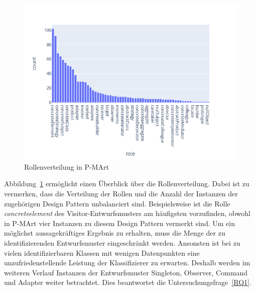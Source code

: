 \pagebreak

\begin{figure}[h]
    \centering
    \includegraphics[scale=0.6]{figures/role_dist.png}
    \caption{Rollenverteilung in P-MArt}
    \label{fig:role_dist}
\end{figure}

Abbildung~\ref{fig:role_dist} ermöglicht einen Überblick über die Rollenverteilung.
Dabei ist zu vermerken, dass die Verteilung der Rollen und die Anzahl der Instanzen der zugehörigen Design Pattern unbalanciert sind. Beispielsweise ist die Rolle \textit{concreteelement} des Visitor-Entwurfsmusters am häufigsten vorzufinden, obwohl in P-MArt vier Instanzen zu diesem Design Pattern vermerkt sind.
Um ein möglichst aussagekräftiges Ergebnis zu erhalten, muss die Menge der zu identifizierenden Entwurfsmuster eingeschränkt werden. Ansonsten ist bei zu vielen identifizierbaren Klassen mit wenigen Datenpunkten eine unzufriedenstellende Leistung der Klassifizierer zu erwarten.
Deshalb werden im weiteren Verlauf Instanzen der Entwurfsmuster Singleton, Observer, Command und Adapter weiter betrachtet.
Dies beantwortet die Untersuchungsfrage~\ref{RQ1}.

